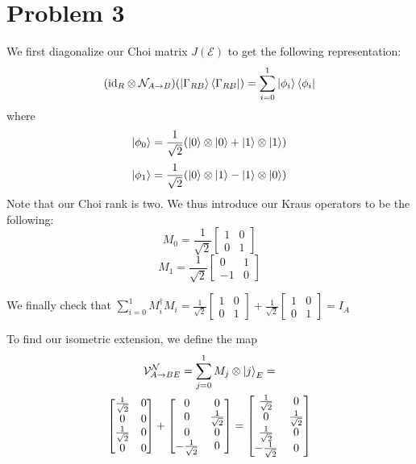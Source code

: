 \documentclass[12pt]{article}%
\begin{document}
\section*{Problem 3}
We first diagonalize our Choi matrix $J(\mathcal{E})$ to get the following representation:
$$ (\text{id}_R \otimes \mathcal{N}_{A\rightarrow B})(\ket{\Gamma_{RB}}\bra{\Gamma_{RB}}) = \sum_{i=0}^1 \ket{\phi_i}\bra{\phi_i}$$ where
$$\ket{\phi_0} = \frac{1}{\sqrt{2}}(\ket{0} \otimes \ket{0} + \ket{1} \otimes \ket{1}) $$
$$\ket{\phi_1} = \frac{1}{\sqrt{2}}(\ket{0} \otimes \ket{1} - \ket{1} \otimes \ket{0}) $$
Note that our Choi rank is two. We thus introduce our Kraus operators to be the following:
$$ M_0 = \frac{1}{\sqrt{2}} \left[\begin{matrix} 1 & 0 \\ 0 & 1 \end{matrix}\right]$$
$$ M_1 = \frac{1}{\sqrt{2}} \left[\begin{matrix} 0 & 1 \\ -1 & 0 \end{matrix}\right]$$

We finally check that
$\sum_{i=0}^1 M_i^\dagger M_i = \frac{1}{\sqrt{2}} \left[\begin{matrix} 1 & 0 \\ 0 & 1 \end{matrix}\right] + \frac{1}{\sqrt{2}} \left[\begin{matrix} 1 & 0 \\ 0 & 1 \end{matrix}\right] = I_A$ \newline \newline

To find our isometric extension, we define the map
\begin{gather*}
\mathcal{V}_{A \rightarrow BE}^{\mathcal{N}} = \sum_{j=0}^1 M_j \otimes  \ket{j}_E = \\
\left[ \begin{matrix} \frac{1}{\sqrt{2}} & 0 \\ 0 & 0 \\ \frac{1}{\sqrt{2}} & 0 \\ 0 & 0 \end{matrix}\right] + \left[ \begin{matrix} 0 & 0 \\ 0 & \frac{1}{\sqrt{2}} \\ 0 & 0 \\ -\frac{1}{\sqrt{2}} & 0 \end{matrix}\right] =
\left[ \begin{matrix}  \frac{1}{\sqrt{2}} & 0 \\ 0 & \frac{1}{\sqrt{2}} \\  \frac{1}{\sqrt{2}} & 0 \\ -\frac{1}{\sqrt{2}} & 0 \end{matrix}\right]
\end{gather*}
\end{document}
